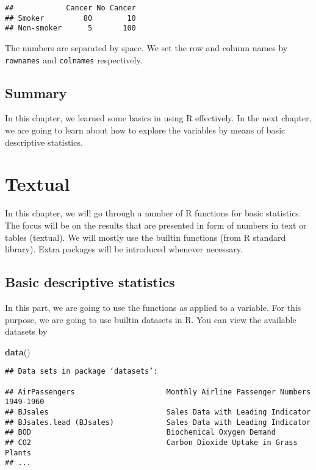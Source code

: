 \documentclass[]{book}
\newenvironment{Shaded}{\begin{snugshade}}{\end{snugshade}}
\newcommand{\KeywordTok}[1]{\textcolor[rgb]{0.13,0.29,0.53}{\textbf{{#1}}}}
\newcommand{\NormalTok}[1]{{#1}}
\theoremstyle{definition}
\theoremstyle{definition}
\theoremstyle{remark}
\begin{document}
\begin{verbatim}
##            Cancer No Cancer
## Smoker         80        10
## Non-smoker      5       100
\end{verbatim}

The numbers are separated by space. We set the row and column names by
\texttt{rownames} and \texttt{colnames} respectively.

\section{Summary}\label{summary}

In this chapter, we learned some basics in using R effectively. In the
next chapter, we are going to learn about how to explore the variables
by means of basic descriptive statistics.

\chapter{Textual}\label{textual}

In this chapter, we will go through a number of R functions for basic
statistics. The focus will be on the results that are presented in form
of numbers in text or tables (textual). We will mostly use the builtin
functions (from R standard library). Extra packages will be introduced
whenever necessary.

\section{Basic descriptive
statistics}\label{basic-descriptive-statistics}

In this part, we are going to use the functions as applied to a
variable. For this purpose, we are going to use builtin datasets in R.
You can view the available datasets by

\begin{Shaded}
\begin{Highlighting}[]
\KeywordTok{data}\NormalTok{()}
\end{Highlighting}
\end{Shaded}

\begin{verbatim}
## Data sets in package ‘datasets’:

## AirPassengers                     Monthly Airline Passenger Numbers 1949-1960
## BJsales                           Sales Data with Leading Indicator
## BJsales.lead (BJsales)            Sales Data with Leading Indicator
## BOD                               Biochemical Oxygen Demand
## CO2                               Carbon Dioxide Uptake in Grass Plants
## ...
\end{verbatim}
\end{document}
